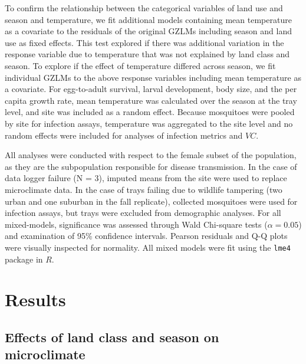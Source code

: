 \documentclass[doublespacing, linenumbers]{bmcart}
\begin{document}
To confirm the relationship between the categorical variables of land use and season and temperature, we fit additional models containing mean temperature as a covariate to the residuals of the original GZLMs including season and land use as fixed effects.
This test explored if there was additional variation in the response variable due to temperature that was not explained by land class and season.
To explore if the effect of temperature differed across season, we fit individual GZLMs to the above response variables including mean temperature as a covariate.
For egg-to-adult survival, larval development, body size, and the per capita growth rate, mean temperature was calculated over the season at the tray level, and site was included as a random effect.
Because mosquitoes were pooled by site for infection assays, temperature was aggregated to the site level and no random effects were included for analyses of infection metrics and $VC$.

All analyses were conducted with respect to the female subset of the population, as they are the subpopulation responsible for disease transmission.
In the case of data logger failure (N = 3), imputed means from the site were used to replace microclimate data.
In the case of trays failing due to wildlife tampering (two urban and one suburban in the fall replicate), collected mosquitoes were used for infection assays, but trays were excluded from demographic analyses.
For all mixed-models, significance was assessed through Wald Chi-square tests ($\alpha=0.05$) and examination of 95\% confidence intervals.
Pearson residuals and Q-Q plots were visually inspected for normality.
All mixed models were fit using the \texttt{lme4} package in $R$.

\section*{Results}

\subsection*{Effects of land class and season on microclimate}
\end{document}
